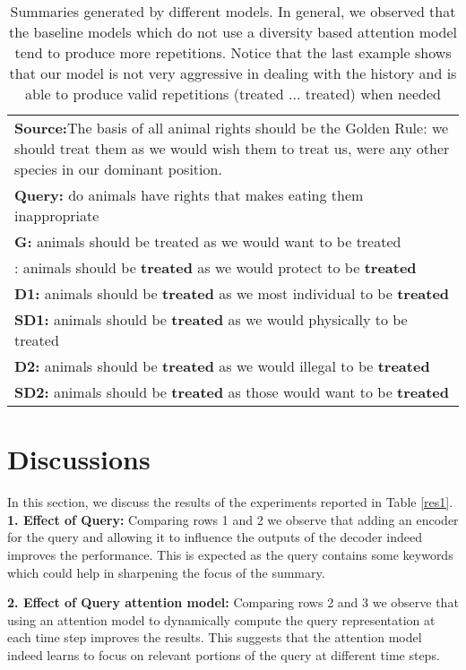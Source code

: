 \documentclass[11pt]{article}
\begin{document}
\begin{table*}[!tbh]
\begin{center}
\begin{tabular}{|p{}|}
\hline
\textbf{Source:}The basis of all animal rights should be the Golden Rule: we should treat them as we would wish them to treat us, were any other species in our dominant position.\\
\textbf{Query:}  do animals have rights that makes eating them inappropriate \\
\textbf{G:} animals should be treated as we would want to be treated   \\
\boldmath{}:
animals should be \textbf{treated} as we would protect to be \textbf{treated} \\
\textbf{D1:} animals should be \textbf{treated} as we most individual to be \textbf{treated}\\
\textbf{SD1:} animals should be \textbf{treated} as we would physically to be treated\\
\textbf{D2:} animals should be \textbf{treated} as we would illegal to be \textbf{treated}\\
\textbf{SD2:} animals should be \textbf{treated} as those would want to be \textbf{treated}\\

\hline

\end{tabular}
\vspace{1pt}
\end{center}
\caption{Summaries generated by different models. In general, we observed that the baseline models which do not use a diversity based attention model tend to produce more repetitions. Notice that the last example shows that our model is not very aggressive in dealing with the history and is able to produce valid repetitions (treated ... treated) when needed}
\label{eg}
\end{table*}

\section{Discussions}
In this section, we discuss the results of the experiments reported in Table \ref{res1}. \\ \noindent \textbf{1. Effect of Query:} Comparing rows 1 and 2 we observe that adding an encoder for the query and allowing it to influence the outputs of the decoder indeed improves the performance. This is expected as the query contains some keywords which could help in sharpening the focus of the summary.   

\noindent \textbf{2. Effect of Query attention model:} Comparing rows 2 and 3 we observe that using an attention model to dynamically compute the query representation at each time step improves the results. This suggests that the attention model indeed learns to focus on relevant portions of the query at different time steps.
\end{document}
